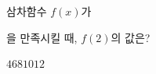 삼차함수 $f(x)$가 \par\smallskip{}\par\smallskip\noindent 을 만족시킬 때, $f(2)$의 값은?
\begin{choices32}{$4$}{$6$}{$8$}{$10$}{$12$}\end{choices32}
